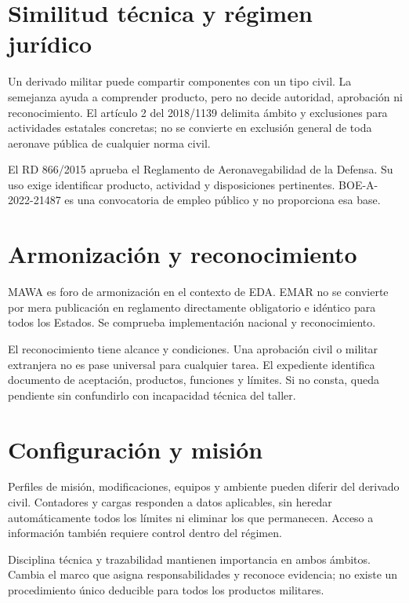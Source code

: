 
\section{Similitud técnica y régimen jurídico}
Un derivado militar puede compartir componentes con un tipo civil. La semejanza ayuda a comprender producto, pero no decide autoridad, aprobación ni reconocimiento. El artículo 2 del 2018/1139 delimita ámbito y exclusiones para actividades estatales concretas; no se convierte en exclusión general de toda aeronave pública de cualquier norma civil.

El RD 866/2015 aprueba el Reglamento de Aeronavegabilidad de la Defensa. Su uso exige identificar producto, actividad y disposiciones pertinentes. BOE-A-2022-21487 es una convocatoria de empleo público y no proporciona esa base.
\section{Armonización y reconocimiento}
MAWA es foro de armonización en el contexto de EDA. EMAR no se convierte por mera publicación en reglamento directamente obligatorio e idéntico para todos los Estados. Se comprueba implementación nacional y reconocimiento.

El reconocimiento tiene alcance y condiciones. Una aprobación civil o militar extranjera no es pase universal para cualquier tarea. El expediente identifica documento de aceptación, productos, funciones y límites. Si no consta, queda pendiente sin confundirlo con incapacidad técnica del taller.
\Needspace{.48\textheight}
\section{Configuración y misión}
Perfiles de misión, modificaciones, equipos y ambiente pueden diferir del derivado civil. Contadores y cargas responden a datos aplicables, sin heredar automáticamente todos los límites ni eliminar los que permanecen. Acceso a información también requiere control dentro del régimen.

Disciplina técnica y trazabilidad mantienen importancia en ambos ámbitos. Cambia el marco que asigna responsabilidades y reconoce evidencia; no existe un procedimiento único deducible para todos los productos militares.
